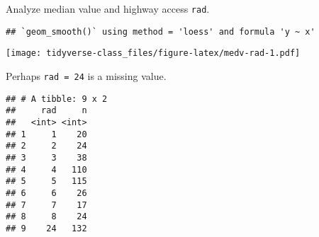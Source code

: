 \documentclass[]{book}
\newenvironment{Shaded}{\begin{snugshade}}{\end{snugshade}}
\newcommand{\KeywordTok}[1]{\textcolor[rgb]{0.13,0.29,0.53}{\textbf{#1}}}
\newcommand{\DataTypeTok}[1]{\textcolor[rgb]{0.13,0.29,0.53}{#1}}
\newcommand{\DecValTok}[1]{\textcolor[rgb]{0.00,0.00,0.81}{#1}}
\newcommand{\FloatTok}[1]{\textcolor[rgb]{0.00,0.00,0.81}{#1}}
\newcommand{\StringTok}[1]{\textcolor[rgb]{0.31,0.60,0.02}{#1}}
\newcommand{\CommentTok}[1]{\textcolor[rgb]{0.56,0.35,0.01}{\textit{#1}}}
\newcommand{\OtherTok}[1]{\textcolor[rgb]{0.56,0.35,0.01}{#1}}
\newcommand{\OperatorTok}[1]{\textcolor[rgb]{0.81,0.36,0.00}{\textbf{#1}}}
\newcommand{\NormalTok}[1]{#1}
\begin{document}
Analyze median value and highway access \texttt{rad}.

\begin{Shaded}
\end{Shaded}

\begin{verbatim}
## `geom_smooth()` using method = 'loess' and formula 'y ~ x'
\end{verbatim}

\texttt{[image: tidyverse-class\_files/figure-latex/medv-rad-1.pdf]}

Perhaps \texttt{rad\ =\ 24} is a missing value.

\begin{Shaded}
\end{Shaded}

\begin{verbatim}
## # A tibble: 9 x 2
##     rad     n
##   <int> <int>
## 1     1    20
## 2     2    24
## 3     3    38
## 4     4   110
## 5     5   115
## 6     6    26
## 7     7    17
## 8     8    24
## 9    24   132
\end{verbatim}

\begin{Shaded}
\end{Shaded}
\end{document}
